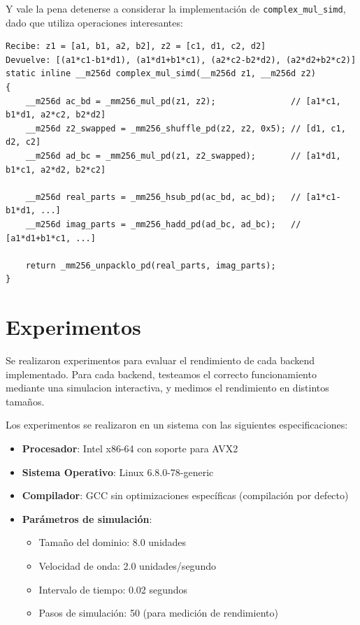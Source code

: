 \documentclass[a4paper]{article}
\begin{document}
Y vale la pena detenerse a considerar la implementación de \texttt{complex\_mul\_simd}, dado que utiliza operaciones interesantes:
\begin{verbatim}
Recibe: z1 = [a1, b1, a2, b2], z2 = [c1, d1, c2, d2]
Devuelve: [(a1*c1-b1*d1), (a1*d1+b1*c1), (a2*c2-b2*d2), (a2*d2+b2*c2)]
static inline __m256d complex_mul_simd(__m256d z1, __m256d z2) 
{
    __m256d ac_bd = _mm256_mul_pd(z1, z2);               // [a1*c1, b1*d1, a2*c2, b2*d2]
    __m256d z2_swapped = _mm256_shuffle_pd(z2, z2, 0x5); // [d1, c1, d2, c2]
    __m256d ad_bc = _mm256_mul_pd(z1, z2_swapped);       // [a1*d1, b1*c1, a2*d2, b2*c2]
    
    __m256d real_parts = _mm256_hsub_pd(ac_bd, ac_bd);   // [a1*c1-b1*d1, ...]
    __m256d imag_parts = _mm256_hadd_pd(ad_bc, ad_bc);   // [a1*d1+b1*c1, ...]
    
    return _mm256_unpacklo_pd(real_parts, imag_parts);
}
\end{verbatim}

\section{Experimentos}

Se realizaron experimentos para evaluar el rendimiento de cada backend implementado. Para cada backend, testeamos el correcto funcionamiento mediante una simulacion interactiva, y medimos
el rendimiento en distintos tamaños.

Los experimentos se realizaron en un sistema con las siguientes especificaciones:
\begin{itemize}
    \item \textbf{Procesador}: Intel x86-64 con soporte para AVX2
    \item \textbf{Sistema Operativo}: Linux 6.8.0-78-generic
    \item \textbf{Compilador}: GCC sin optimizaciones específicas (compilación por defecto)
    \item \textbf{Parámetros de simulación}:
          \begin{itemize}
              \item Tamaño del dominio: 8.0 unidades
              \item Velocidad de onda: 2.0 unidades/segundo
              \item Intervalo de tiempo: 0.02 segundos
              \item Pasos de simulación: 50 (para medición de rendimiento)
          \end{itemize}
\end{itemize}
\end{document}
